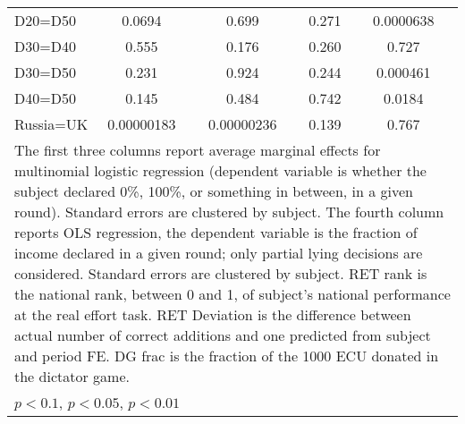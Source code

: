 \begin{tabular}{l|cccccc|cc}
D20=D50         &   0.0694         &         &    0.699         &         &    0.271         &         &0.0000638         &         \\
D30=D40         &    0.555         &         &    0.176         &         &    0.260         &         &    0.727         &         \\
D30=D50         &    0.231         &         &    0.924         &         &    0.244         &         & 0.000461         &         \\
D40=D50         &    0.145         &         &    0.484         &         &    0.742         &         &   0.0184         &         \\
Russia=UK       &0.00000183         &         &0.00000236         &         &    0.139         &         &    0.767         &         \\
\hline\hline
\multicolumn{9}{p{16cm}}{\tiny The first three columns report average marginal effects for multinomial logistic regression (dependent variable is whether the subject declared 0\%, 100\%, or something in between, in a given round). Standard errors are clustered by subject. The fourth column reports OLS regression, the dependent variable is the fraction of income declared in a given round; only partial lying decisions are considered. Standard errors are clustered by subject. RET rank is the national rank, between 0 and 1, of subject's national performance at the real effort task. RET Deviation is the difference between actual number of correct additions and one predicted from subject and period FE. DG frac is the fraction of the 1000 ECU donated in the dictator game.}\\
\multicolumn{9}{l}{\tiny \sym{*} \(p<0.1\), \sym{**} \(p<0.05\), \sym{***} \(p<0.01\)}\\
\end{tabular}